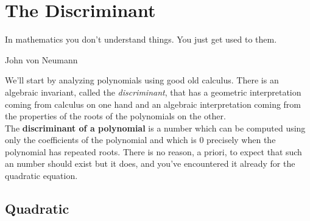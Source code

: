 
\begin{comment}
	Hey Aaron, I'm leaving comments on your todonotes using this environment. Feel free to make up problems for the topics you mentioned. We can then rearrange, clean, purge the rest of the notes and make them more coherent and presentable.
\end{comment}

\section{The Discriminant}
\epigraph{In mathematics you don't understand things. You just get used to them.}{John von Neumann}

We'll start by analyzing polynomials using good old calculus. There is an algebraic invariant, called the \emph{discriminant}, that has a geometric interpretation coming from calculus on one hand and an algebraic interpretation coming from the properties of the roots of the polynomials on the other.\\

The \textbf{discriminant of a polynomial} is a number which can be computed using only the coefficients of the polynomial and which is 0 precisely when the polynomial has repeated roots. There is no reason, a priori, to expect that such an number should exist but it does, and you've encountered it already for the quadratic equation.






\subsection{Quadratic}
	
